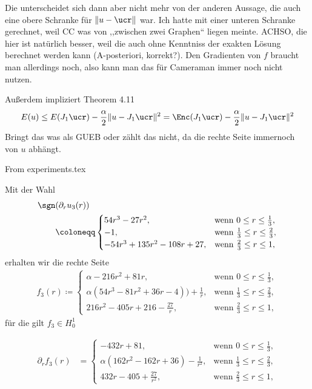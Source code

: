   Die unterscheidet sich dann aber nicht mehr von der anderen Aussage, die auch 
  eine obere Schranke für $\Vert u-\ucr\Vert$ war.
  Ich hatte mit einer unteren Schranke gerechnet, weil CC was von ,,zwischen
  zwei Graphen`` liegen meinte.
  ACHSO, die hier ist natürlich besser, weil die auch ohne Kenntniss der exakten
  Lösung berechnet werden kann (A-posteriori, korrekt?). Den Gradienten von $f$
  braucht man allerdings noch, also kann man das für Cameraman immer noch nicht
  nutzen.

  Außerdem impliziert Theorem 4.11
  \begin{align*}
    E(u)\leq E(J_1 \ucr)-\frac{\alpha}{2}\Vert u - J_1 \ucr\Vert^2 
    = \Enc(J_1 \ucr)-\frac{\alpha}{2}\Vert u - J_1 \ucr\Vert^2 
  \end{align*}
  Bringt das was als GUEB oder zählt das nicht, da die rechte Seite immernoch von
  $u$ abhängt.

From experiments.tex


Mit der Wahl
\begin{align*}
  \sgn&(\partial_r u_3(r)) \\
  &\coloneqq 
  \begin{cases}
    54r^3-27r^2, & \text{wenn } 0\leq r\leq\frac{1}{3},\\
    -1, & \text{wenn } \frac{1}{3}\leq r\leq \frac{2}{3},\\
    -54r^3 + 135r^2 - 108r + 27, & \text{wenn } \frac{2}{3}\leq r\leq 1,
  \end{cases}
\end{align*}
erhalten wir die rechte Seite
\begin{align*}
  f_3(r)\coloneqq 
  \begin{cases}
    \alpha - 216r^2 + 81r, &
    \text{wenn } 0\leq r\leq\frac{1}{3},\\
    \alpha\left(54r^3 - 81r^2 + 36r - 4\right)) + \frac{1}{r}, & 
    \text{wenn } \frac{1}{3}\leq r\leq \frac{2}{3},\\
    216r^2 - 405r + 216 - \frac{27}{r}, & 
    \text{wenn } \frac{2}{3}\leq r\leq 1,
  \end{cases}
\end{align*}
für die gilt $f_3\in H^1_0$

\begin{align*}
  \partial_r f_3(r) &=
  \begin{cases}
    - 432r + 81, & \text{wenn } 0\leq r\leq\frac{1}{3},\\
    \alpha\left(162r^2 - 162r + 36\right) - \frac{1}{r^2}, & 
    \text{wenn } \frac{1}{3}\leq r\leq \frac{2}{3},\\
    432r - 405 + \frac{27}{r^2}, & 
    \text{wenn } \frac{2}{3}\leq r\leq 1,
  \end{cases}
\end{align*}
